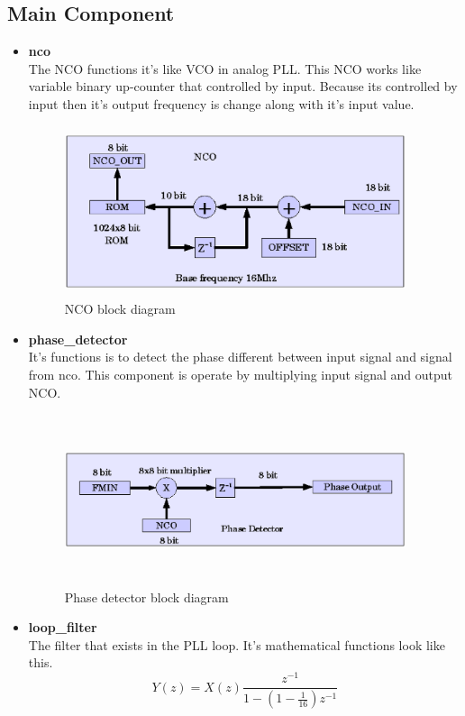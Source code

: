 \documentclass[a4paper,10pt]{article}
\begin{document}
\subsection{Main Component}
   \begin{itemize}
   \item \textbf{nco}\\ 
   		The NCO functions it's like VCO in analog PLL. 
   		This NCO works like variable binary up-counter that controlled 
		by input. Because its controlled by input then it's output
		frequency is change along with it's input value.

\begin{figure}[H]
\center
\includegraphics[width=10.0cm,height=5.0cm]{nco.eps}
\caption {NCO block diagram}
\end{figure}

   \item \textbf{phase\_detector}\\ 
   		It's functions is to detect the phase
                different between input signal and signal from nco. This
		component is operate by multiplying input signal and output NCO.

\begin{figure}[H]
\center
\includegraphics[width=10.0cm,height=5.0cm]{phase_detector.eps}
\caption {Phase detector block diagram}
\end{figure}

   \item \textbf{loop\_filter}\\
   		The filter that exists in the PLL loop. It's mathematical
		functions look like this. 
		\begin{displaymath}
		Y(z) = X(z) \frac{z^{-1}}{1-(1-\frac{1}{16})z^{-1}}
		\end{displaymath}


\end{itemize}
\end{document}
